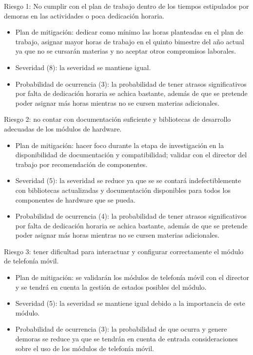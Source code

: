 \documentclass[
11pt, %
]{charter}
\begin{document}
Riesgo 1: No cumplir con el plan de trabajo dentro de los tiempos estipulados por demoras en las actividades o poca dedicación horaria.
\begin{itemize}
	\item Plan de mitigación: dedicar como mínimo las horas planteadas en el plan de trabajo, asignar mayor horas de trabajo en el quinto bimestre del año actual ya que no se cursarán materias y no aceptar otros compromisos laborales.
	\item Severidad (8): la severidad se mantiene igual.
	\item Probabilidad de ocurrencia (3): la probabilidad de tener atrasos significativos por falta de dedicación horaria se achica bastante, además de que se pretende poder asignar más horas mientras no se cursen materias adicionales.
\end{itemize}

Riesgo 2: no contar con documentación suficiente y bibliotecas de desarrollo adecuadas de los módulos de hardware.
\begin{itemize}
	\item Plan de mitigación: hacer foco durante la etapa de investigación en la disponibilidad de documentación y compatibilidad; validar con el director del trabajo por recomendación de componentes.
	\item Severidad (5): la severidad se reduce ya que se se contará indefectiblemente con bibliotecas actualizadas y documentación disponibles para todos los componentes de hardware que se pueda.
	\item Probabilidad de ocurrencia (4): la probabilidad de tener atrasos significativos por falta de dedicación horaria se achica bastante, además de que se pretende poder asignar más horas mientras no se cursen materias adicionales.
\end{itemize}
 
Riesgo 3: tener dificultad para interactuar y configurar correctamente el módulo de telefonía móvil.
\begin{itemize}
	\item Plan de mitigación: se validarán los módulos de telefonía móvil con el director y se tendrá en cuenta la gestión de estados posibles del módulo.
	\item Severidad (5):  la severidad se mantiene igual debido a la importancia de este módulo.
	\item Probabilidad de ocurrencia (3): la probabilidad de que ocurra y genere demoras se reduce ya que se tendrán en cuenta de entrada consideraciones sobre el uso de los módulos de telefonía móvil.
\end{itemize}
\end{document}
